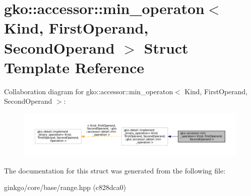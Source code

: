 \hypertarget{structgko_1_1accessor_1_1min__operaton}{}\section{gko\+:\+:accessor\+:\+:min\+\_\+operaton$<$ Kind, First\+Operand, Second\+Operand $>$ Struct Template Reference}
\label{structgko_1_1accessor_1_1min__operaton}


Collaboration diagram for gko\+:\+:accessor\+:\+:min\+\_\+operaton$<$ Kind, First\+Operand, Second\+Operand $>$\+:
\nopagebreak
\begin{figure}[H]
\begin{center}
\leavevmode
\includegraphics[width=350pt]{structgko_1_1accessor_1_1min__operaton__coll__graph}
\end{center}
\end{figure}


The documentation for this struct was generated from the following file\+:\begin{DoxyCompactItemize}
\item 
ginkgo/core/base/range.\+hpp (c828dca0)\end{DoxyCompactItemize}
